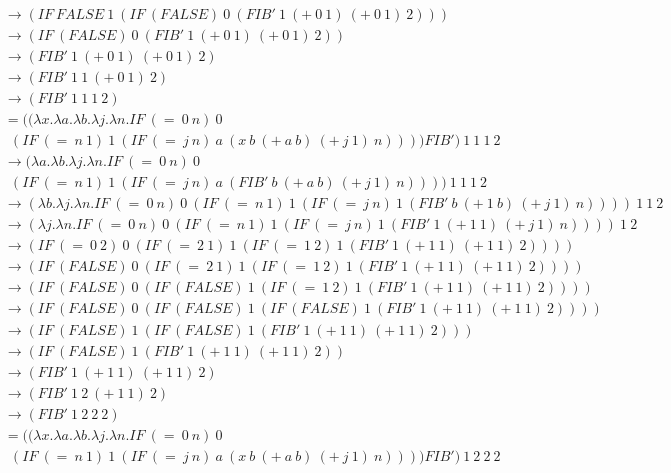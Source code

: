 \documentclass{article}
\begin{document}
\begin{enumerate}
\begin{align*}
\\&\rightarrow (IF\ FALSE\ 1\ (IF\ (FALSE)\ 0\ (FIB'\ 1\ (+\ 0\ 1)\ (+\ 0\ 1)\ 2)))
\\&\rightarrow (IF\ (FALSE)\ 0\ (FIB'\ 1\ (+\ 0\ 1)\ (+\ 0\ 1)\ 2))
\\&\rightarrow (FIB'\ 1\ (+\ 0\ 1)\ (+\ 0\ 1)\ 2)
\\&\rightarrow (FIB'\ 1\ 1\ (+\ 0\ 1)\ 2)
\\&\rightarrow (FIB'\ 1\ 1\ 1\ 2)
\\&= ((\lambda x . \lambda a . \lambda b . \lambda j . \lambda n .IF\ (=\ 0\ n)\ 0\ \\&\ \ (IF\ (=\ n\ 1)\ 1\ (IF\ (=\ j\ n)\ a\ (x\ b\ (+\ a\ b)\ (+\ j\ 1)\ n)))) FIB')\ 1\ 1\ 1\ 2
\\&\rightarrow (\lambda a . \lambda b . \lambda j . \lambda n .IF\ (=\ 0\ n)\ 0\ \\&\ \ (IF\ (=\ n\ 1)\ 1\ (IF\ (=\ j\ n)\ a\ (FIB'\ b\ (+\ a\ b)\ (+\ j\ 1)\ n))))\ 1\ 1\ 1\ 2
\\&\rightarrow (\lambda b . \lambda j . \lambda n .IF\ (=\ 0\ n)\ 0\ (IF\ (=\ n\ 1)\ 1\ (IF\ (=\ j\ n)\ 1\ (FIB'\ b\ (+\ 1\ b)\ (+\ j\ 1)\ n))))\ 1\ 1\ 2
\\&\rightarrow (\lambda j . \lambda n .IF\ (=\ 0\ n)\ 0\ (IF\ (=\ n\ 1)\ 1\ (IF\ (=\ j\ n)\ 1\ (FIB'\ 1\ (+\ 1\ 1)\ (+\ j\ 1)\ n))))\ 1\ 2
\\&\rightarrow (IF\ (=\ 0\ 2)\ 0\ (IF\ (=\ 2\ 1)\ 1\ (IF\ (=\ 1\ 2)\ 1\ (FIB'\ 1\ (+\ 1\ 1)\ (+\ 1\ 1)\ 2))))
\\&\rightarrow (IF\ (FALSE)\ 0\ (IF\ (=\ 2\ 1)\ 1\ (IF\ (=\ 1\ 2)\ 1\ (FIB'\ 1\ (+\ 1\ 1)\ (+\ 1\ 1)\ 2))))
\\&\rightarrow (IF\ (FALSE)\ 0\ (IF\ (FALSE)\ 1\ (IF\ (=\ 1\ 2)\ 1\ (FIB'\ 1\ (+\ 1\ 1)\ (+\ 1\ 1)\ 2))))
\\&\rightarrow (IF\ (FALSE)\ 0\ (IF\ (FALSE)\ 1\ (IF\ (FALSE)\ 1\ (FIB'\ 1\ (+\ 1\ 1)\ (+\ 1\ 1)\ 2))))
\\&\rightarrow (IF\ (FALSE)\ 1\ (IF\ (FALSE)\ 1\ (FIB'\ 1\ (+\ 1\ 1)\ (+\ 1\ 1)\ 2)))
\\&\rightarrow (IF\ (FALSE)\ 1\ (FIB'\ 1\ (+\ 1\ 1)\ (+\ 1\ 1)\ 2))
\\&\rightarrow (FIB'\ 1\ (+\ 1\ 1)\ (+\ 1\ 1)\ 2)
\\&\rightarrow (FIB'\ 1\ 2\ (+\ 1\ 1)\ 2)
\\&\rightarrow (FIB'\ 1\ 2\ 2\ 2)
\\&= ((\lambda x . \lambda a . \lambda b . \lambda j . \lambda n .IF\ (=\ 0\ n)\ 0\ \\&\ \ (IF\ (=\ n\ 1)\ 1\ (IF\ (=\ j\ n)\ a\ (x\ b\ (+\ a\ b)\ (+\ j\ 1)\ n)))) FIB')\ 1\ 2\ 2\ 2

\end{align*}
\end{enumerate}
\end{document}
